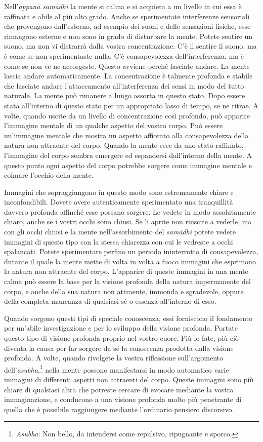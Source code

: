 Nell'\emph{appanā samādhi} la mente si calma e si acquieta a un livello
in cui essa è raffinata e abile al più alto grado. Anche se sperimentate
interferenze sensoriali che provengono dall'esterno, ad esempio dei
suoni e delle sensazioni fisiche, esse rimangono esterne e non sono in
grado di disturbare la mente. Potete sentire un suono, ma non vi
distrarrà dalla vostra concentrazione. C'è il sentire il suono, ma è
come se non sperimentaste nulla. C'è consapevolezza dell'interferenza,
ma è come se non ve ne accorgeste. Questo avviene perché lasciate
andare. La mente lascia andare automaticamente. La concentrazione è
talmente profonda e stabile che lasciate andare l'attaccamento
all'interferenza dei sensi in modo del tutto naturale. La mente può
rimanere a lungo assorta in questo stato. Dopo essere stata all'interno
di questo stato per un appropriato lasso di tempo, se ne ritrae. A
volte, quando uscite da un livello di concentrazione così profondo, può
apparire l'immagine mentale di un qualche aspetto del vostro corpo. Può
essere un'immagine mentale che mostra un aspetto affiorato alla
consapevolezza della natura non attraente del corpo. Quando la mente
esce da uno stato raffinato, l'immagine del corpo sembra emergere ed
espandersi dall'interno della mente. A questo punto ogni aspetto del
corpo potrebbe sorgere come immagine mentale e colmare l'occhio della
mente.

Immagini che sopraggiungono in questo modo sono estremamente chiare e
inconfondibili. Dovete avere autenticamente sperimentato una
tranquillità davvero profonda affinché esse possano sorgere. Le vedete
in modo assolutamente chiaro, anche se i vostri occhi sono chiusi. Se li
aprite non riuscite a vederle, ma con gli occhi chiusi e la mente
nell'assorbimento del \emph{samādhi} potete vedere immagini di questo
tipo con la stessa chiarezza con cui le vedreste a occhi spalancati.
Potete sperimentare perfino un periodo ininterrotto di consapevolezza,
durante il quale la mente mette di volta in volta a fuoco immagini che
esprimono la natura non attraente del corpo. L'apparire di queste
immagini in una mente calma può essere la base per la visione profonda
della natura impermanente del corpo, e anche della sua natura non
attraente, immonda e sgradevole, oppure della completa mancanza di
qualsiasi sé o essenza all'interno di esso.

Quando sorgono questi tipi di speciale conoscenza, essi forniscono il
fondamento per un'abile investigazione e per lo sviluppo della visione
profonda. Portate questo tipo di visione profonda proprio nel vostro
cuore. Più lo fate, più ciò diventa la causa per far sorgere da sé la
conoscenza prodotta dalla visione profonda. A volte, quando rivolgete la
vostra riflessione sull'argomento dell'\emph{asubha},\footnote{\emph{Asubha}:
  Non bello, da intendersi come repulsivo, ripugnante e sporco.} nella
mente possono manifestarsi in modo automatico varie immagini di
differenti aspetti non attraenti del corpo. Queste immagini sono più
chiare di qualsiasi altra che potreste cercare di evocare mediante la
vostra immaginazione, e conducono a una visione profonda molto più
penetrante di quella che è possibile raggiungere mediante l'ordinario
pensiero discorsivo.

